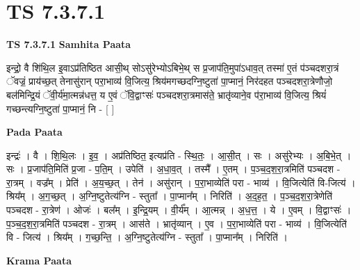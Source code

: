 \documentclass[17pt]{extarticle}
\begin{document}
\section{ TS 7.3.7.1 }

\textbf{TS 7.3.7.1 } \newline
\textbf{Samhita Paata} \newline

इन्द्रो॒ वै शि॑थि॒ल इ॒वाऽप्र॑तिष्ठित आसी॒थ् सोऽसु॑रेभ्योऽबिभे॒थ् स प्र॒जाप॑ति॒मुपा॑ऽधाव॒त् तस्मा॑ ए॒तं प॑ञ्चदशरा॒त्रं ॅवज्रं॒ प्राय॑च्छ॒त् तेनासु॑रान् परा॒भाव्य॑ वि॒जित्य॒ श्रिय॑मगच्छदग्नि॒ष्टुता॑ पा॒प्मानं॒ निर॑दहत पञ्चदशरा॒त्रेणौजो॒ बल॑मिन्द्रि॒यं ॅवी॒र्य॑मा॒त्मन्न॑धत्त॒ य ए॒वं ॅवि॒द्वाꣳसः॑ पञ्चदशरा॒त्रमास॑ते॒ भ्रातृ॑व्याने॒व प॑रा॒भाव्य॑ वि॒जित्य॒ श्रियं॑ गच्छन्त्यग्नि॒ष्टुता॑ पा॒प्मानं॒ नि - [  ] \newline

\textbf{Pada Paata} \newline

इन्द्रः॑ । वै । शि॒थि॒लः । इ॒व॒ । अप्र॑तिष्ठित॒ इत्यप्र॑ति - स्थि॒तः॒ । आ॒सी॒त् । सः । असु॑रेभ्यः । अ॒बि॒भे॒त् । सः । प्र॒जाप॑ति॒मिति॑ प्र॒जा - प॒ति॒म् । उपेति॑ । अ॒धा॒व॒त् । तस्मै᳚ । ए॒तम् । प॒ञ्च॒द॒श॒रा॒त्रमिति॑ पञ्चदश - रा॒त्रम् । वज्र᳚म् । प्रेति॑ । अ॒य॒च्छ॒त् । तेन॑ । असु॑रान् । प॒रा॒भाव्येति॑ परा - भाव्य॑ । वि॒जित्येति॑ वि-जित्य॑ । श्रिय᳚म् । अ॒ग॒च्छ॒त् । अ॒ग्नि॒ष्टुतेत्य॑ग्नि - स्तुता᳚ । पा॒प्मान᳚म् । निरिति॑ । अ॒द॒ह॒त॒ । प॒ञ्च॒द॒श॒रा॒त्रेणेति॑ पञ्चदश - रा॒त्रेण॑ । ओजः॑ । बल᳚म् । इ॒न्द्रि॒यम् । वी॒र्य᳚म् । आ॒त्मन्न् । अ॒ध॒त्त॒ । ये । ए॒वम् । वि॒द्वाꣳसः॑ । प॒ञ्च॒द॒श॒रा॒त्रमिति॑ पञ्चदश - रा॒त्रम् । आस॑ते । भ्रातृ॑व्यान् । ए॒व । प॒रा॒भाव्येति॑ परा - भाव्य॑ । वि॒जित्येति॑ वि - जित्य॑ । श्रिय᳚म् । ग॒च्छ॒न्ति॒ । अ॒ग्नि॒ष्टुतेत्य॑ग्नि - स्तुता᳚ । पा॒प्मान᳚म् । निरिति॑ ।  \newline


\textbf{Krama Paata} \newline
\end{document}
